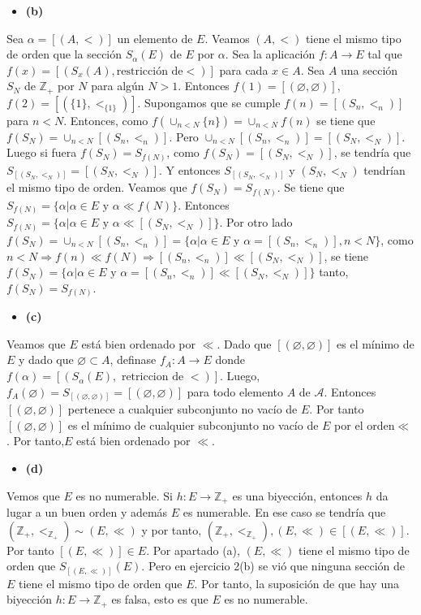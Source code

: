 \documentclass{article}
\begin{document}
\begin{itemize}
\item \bf (b) \rm
\end{itemize}
Sea $\alpha=[(A,<)]$ un elemento de $E$. Veamos $(A,<)$ tiene el mismo tipo de orden que la sección $S_\alpha(E)$ de $E$ por $\alpha$. Sea la aplicación $f:A\rightarrow E$ tal que $f(x)= [(S_x(A), \text{restricción de} <)]$ para cada $x\in A$. Sea $A$ una sección $S_N$ de $\mathbb{Z}_{+}$ por $N$ para algún $N>1$. Entonces $f(1)=[(\varnothing,\varnothing)]$, $f(2)=[(\{1\},<_{\{1\}})]$. Supongamos que se cumple $f(n)=[(S_n,<_{n})]$ para $n<N$. Entonces, como $f(\cup_{n<N}\{n\})=\cup_{n<N}f(n)$ se tiene que $f(S_N)=\cup_{n<N}[(S_n,<_{n})]$. Pero $\cup_{n<N}[(S_n,<_{n})]=[(S_N,<_{N})]$. Luego si fuera $f(S_N)=S_{f(N)}$, como $f(S_N)=[(S_N,<_{N})]$, se tendría que $S_{[(S_N,<_{N})]}= [(S_N,<_{N})]$. Y entonces $S_{[(S_N,<_{N})]}$ y $(S_N,<_{N})$ tendrían el mismo tipo de orden. Veamos que $f(S_N)=S_{f(N)}$. Se tiene que $S_{f(N)}=\{\alpha| \alpha\in E \text{ y }\alpha\ll f(N)\}$. Entonces $S_{f(N)}=\{\alpha| \alpha\in E \text{ y }\alpha\ll [(S_N,<_{N})]\}$. Por otro lado $f(S_N)= \cup_{n<N}[(S_n,<_{n})]=\{\alpha| \alpha\in E \text{ y }\alpha=[(S_n,<_{n})], n<N\}$, como $n<N\Rightarrow f(n)\ll f(N) \Rightarrow [(S_n,<_{n})]\ll[(S_N,<_{N})]$, se tiene $f(S_N)=\{\alpha| \alpha\in E \text{ y }\alpha=[(S_n,<_{n})]\ll [(S_N,<_{N})]\}$ tanto, $f(S_N)=S_{f(N)}$.
\begin{itemize}
\item \bf (c) \rm
\end{itemize}
Veamos que $E$ está bien ordenado por $\ll$. Dado que $[(\varnothing,\varnothing)]$ es el mínimo de $E$ y dado que $\varnothing \subset A$, definase $f_A: A\rightarrow E$ donde $f(\alpha)= [(S_\alpha(E), \text{ retriccion de }<)]$. Luego, $f_A(\varnothing ) = S_{[(\varnothing,\varnothing)]}=[(\varnothing,\varnothing)]$ para todo elemento $A$ de $\mathcal{A}$. Entonces $[(\varnothing,\varnothing)]$ pertenece a cualquier subconjunto no vacío de $E$. Por tanto $[(\varnothing,\varnothing)]$ es el mínimo de cualquier subconjunto no vacío de $E$ por el orden$\ll$. Por tanto,$E$ está bien ordenado por $\ll$.
\begin{itemize}
\item \bf (d) \rm
\end{itemize}
Vemos que $E$ es no numerable. Si $h:E\rightarrow \mathbb{Z}_+$ es una biyección, entonces $h$ da lugar a un buen orden y además $E$ es numerable. En ese caso se tendría que $(\mathbb{Z}_+,<_{\mathbb{Z}_+})\sim (E,\ll)$ y por tanto, $(\mathbb{Z}_+,<_{\mathbb{Z}_+}), (E,\ll)\in [(E,\ll)]$. Por tanto $[(E,\ll)]\in E$. Por apartado (a), $(E,\ll)$ tiene el mismo tipo de orden que $S_{[(E,\ll)]} (E)$. Pero en ejercicio 2(b) se vió que ninguna sección de $E$ tiene el mismo tipo de orden que $E$. Por tanto, la suposición de que hay una biyección $h:E\rightarrow \mathbb{Z}_+$ es falsa, esto es que $E$ es no numerable.
\end{document}
